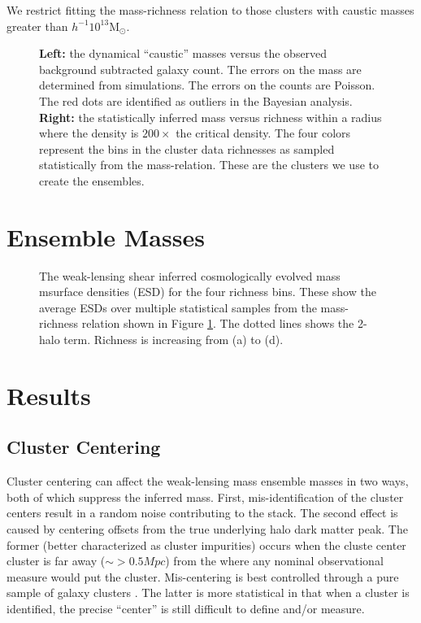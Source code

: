\documentclass[apj]{emulateapj}
\begin{document}
We restrict fitting the mass-richness relation to those clusters with caustic masses greater than  $h^{-1}10^{13}$M$_{\odot}$.

\label{sec:ensembles}
\begin{figure*}
\caption{{\bf Left:} the dynamical ``caustic'' masses versus the observed background subtracted galaxy count. The errors on the mass are determined from simulations. The errors on the counts are Poisson. The red dots are identified as outliers in the Bayesian analysis. {\bf Right:} the statistically inferred mass versus richness within a radius where the density is $200\times$ the critical density. The four colors represent the bins in the cluster data richnesses as sampled statistically from the mass-relation. These are the clusters we use to create the ensembles.}
\label{fig:mass_richness}
\end{figure*}

\section{Ensemble Masses}

\label{sec:masses}
\begin{figure*}
\caption{The weak-lensing shear inferred cosmologically evolved mass msurface densities (ESD) for the four richness bins. These show the average ESDs over multiple statistical samples from the mass-richness relation shown in Figure \ref{fig:mass_richness}. The dotted lines shows the 2-halo term. Richness is increasing from (a) to (d).}
\label{fig:mass_wl}
\end{figure*}

\begin{figure*}
\caption{}
\label{fig:phase_spaces}
\end{figure*}

\section{Results}
\label{sec:results}

\subsection{Cluster Centering}
Cluster centering can affect the weak-lensing mass ensemble masses in two ways, both of which suppress the inferred mass. First, mis-identification of the cluster centers result in a random noise contributing to the stack. The second effect is caused by centering offsets from the true underlying halo dark matter peak. The former (better characterized as cluster impurities) occurs when the cluste center cluster is far away ($\sim > 0.5Mpc$) from the where any  nominal observational measure would put the cluster. Mis-centering is best controlled through a pure sample of galaxy clusters \citep{Miller2005}.  The latter is more statistical in that when a cluster is identified, the precise ``center'' is still difficult to define and/or measure. 
\end{document}
